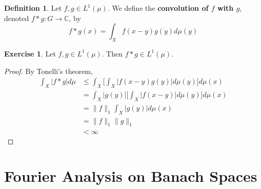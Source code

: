 \documentclass[12pt]{amsart}
\theoremstyle{definition}
\newtheorem{defn}[definition]{Definition}
\newtheorem{ex}[definition]{Exercise}
\newcommand{\C}{\mathbb{C}}
\newcommand{\lex}[1]{\label{ex:#1}}
\newcommand{\ld}[1]{\label{defn:#1}}
\begin{document}
	\begin{defn} \ld{00000} 
	Let $f, g \in L^1(\mu)$. We define the \textbf{convolution of $f$ with $g$}, denoted $f * g: G \rightarrow \C$, by $$ f * g(x) = \int_X f(x-y)g(y) d\mu(y)$$
	\end{defn}
	
	\begin{ex} \lex{00000} 
	Let $f, g \in L^1(\mu)$. Then $f * g \in L^1(\mu)$. 
	\end{ex}
	
	\begin{proof}
	By Tonelli's theorem, 
	\begin{align*}
	\int_X |f *g| d\mu 
	&\leq \int_X \bigg[  \int_X |f(x-y)g(y)| d\mu(y) \bigg] d\mu(x) \\
	&= \int_X |g(y)| \bigg[  \int_X |f(x-y)| d\mu(y) \bigg] d\mu(x) \\
	&=  \|f\|_1 \int_X |g(y)| d\mu(x) \\
	&= \|f\|_1 \|g\|_1\\
	& < \infty
	\end{align*}
	\end{proof}

























	\newpage
	\section{Fourier Analysis on Banach Spaces}
	
	
	
	
	
	
	
	
	
	
	
	
	
	
	
	
	
	
	
	
	
	
	
\end{document}

